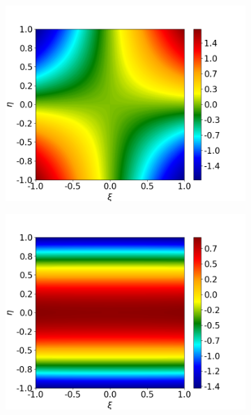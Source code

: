 \documentclass[preprint,12pt]{elsarticle}
\begin{document}
\begin{figure}
	\centering
	\begin{subfigure}[b]{0.49\textwidth}
		\centering
		\includegraphics[width=\textwidth]{figs/FFFF1.png}
		\caption[]%
		{{\small }}    
		\label{fig:FFF1}
	\end{subfigure}
	\hfill
	\begin{subfigure}[b]{0.49\textwidth}  
		\centering 
		\includegraphics[width=\textwidth]{figs/FFFF2.png}
		\caption[]%
		{{\small }}    
		\label{fig:FFF2}
	\end{subfigure}
	\vfill
	\begin{subfigure}[b]{0.49\textwidth}   

\end{subfigure}
\end{figure}
\end{document}
